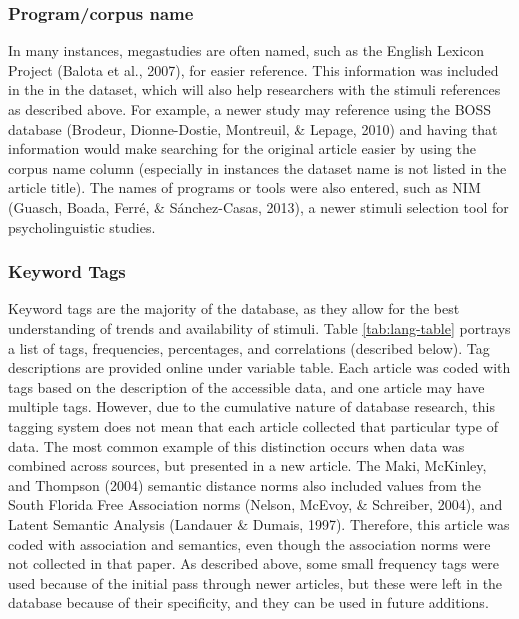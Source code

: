 \documentclass[english,,man]{apa6}
\theoremstyle{definition}
\theoremstyle{definition}
\theoremstyle{definition}
\theoremstyle{remark}
\begin{document}
\hypertarget{programcorpus-name}{%
\subsubsection{Program/corpus name}\label{programcorpus-name}}

In many instances, megastudies are often named, such as the English
Lexicon Project (Balota et al., 2007), for easier reference. This
information was included in the in the dataset, which will also help
researchers with the stimuli references as described above. For example,
a newer study may reference using the BOSS database (Brodeur,
Dionne-Dostie, Montreuil, \& Lepage, 2010) and having that information
would make searching for the original article easier by using the corpus
name column (especially in instances the dataset name is not listed in
the article title). The names of programs or tools were also entered,
such as NIM (Guasch, Boada, Ferré, \& Sánchez-Casas, 2013), a newer
stimuli selection tool for psycholinguistic studies.

\hypertarget{keyword-tags}{%
\subsubsection{Keyword Tags}\label{keyword-tags}}

Keyword tags are the majority of the database, as they allow for the
best understanding of trends and availability of stimuli. Table
\ref{tab:lang-table} portrays a list of tags, frequencies, percentages,
and correlations (described below). Tag descriptions are provided online
under variable table. Each article was coded with tags based on the
description of the accessible data, and one article may have multiple
tags. However, due to the cumulative nature of database research, this
tagging system does not mean that each article collected that particular
type of data. The most common example of this distinction occurs when
data was combined across sources, but presented in a new article. The
Maki, McKinley, and Thompson (2004) semantic distance norms also
included values from the South Florida Free Association norms (Nelson,
McEvoy, \& Schreiber, 2004), and Latent Semantic Analysis (Landauer \&
Dumais, 1997). Therefore, this article was coded with association and
semantics, even though the association norms were not collected in that
paper. As described above, some small frequency tags were used because
of the initial pass through newer articles, but these were left in the
database because of their specificity, and they can be used in future
additions.
\end{document}

